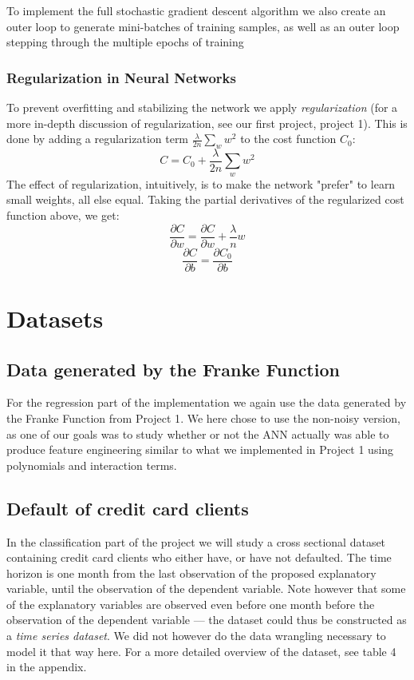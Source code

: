 \documentclass[10pt, a4paper, twocolumn]{article}
\begin{document}
			To implement the full stochastic gradient descent algorithm we also create an outer loop to generate mini-batches of training samples, as well as an outer loop stepping through the multiple epochs of training
		\subsubsection{Regularization in Neural Networks}
			To prevent overfitting and stabilizing the network we apply \emph{regularization} (for a more in-depth discussion of regularization, see our first project, project 1\cite{Project1}). This is done by adding a regularization term $\frac{\lambda}{2n}\sum_w w^2$ to the cost function $C_0$:
				\begin{equation} 
					C = C_0 + \frac{\lambda}{2n} \sum_w w^2 \tag{Regularized cost function}
				\end{equation}
			The effect of regularization, intuitively, is to make the network "prefer" to learn small weights, all else equal. Taking the partial derivatives of the regularized cost function above, we get:
			$$\frac{\partial C}{\partial w}=\frac{\partial C}{\partial w}+\frac{\lambda}{n}w$$
			$$\frac{\partial C}{\partial b}=\frac{\partial C_0}{\partial b}$$
\section{Datasets}
	\subsection{Data generated by the Franke Function}
		For the regression part of the implementation we again use the data generated by the Franke Function from Project 1\cite{Project1}. We here chose to use the non-noisy version, as one of our goals was to study whether or not the ANN actually was able to produce feature engineering similar to what we implemented in Project 1 using polynomials and interaction terms.
	\subsection{Default of credit card clients}
		In the classification part of the project we will study a cross sectional dataset containing credit card clients who either have, or have not defaulted. The time horizon is one month from the last observation of the proposed explanatory variable, until the observation of the dependent variable. Note however that some of the explanatory variables are observed even before one month before the observation of the dependent variable --- the dataset could thus be constructed as a \emph{time series dataset}. We did not however do the data wrangling necessary to model it that way here. For a more detailed overview of the dataset, see table 4 in the appendix.
\end{document}
